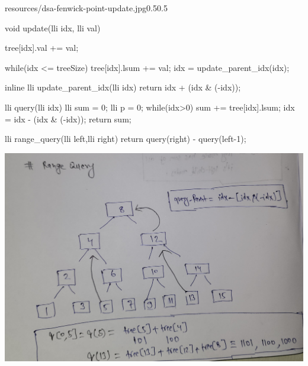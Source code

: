 \begin{lfigure}{resources/dsa-fenwick-point-update.jpg}{0.5}{0.5}

    \begin{code3}
    void update(lli idx, lli val)
    {
        tree[idx].val += val;

        while(idx <= treeSize)
        {
            tree[idx].lsum += val;
            idx = update_parent_idx(idx);
        }
    }

  
    inline lli update_parent_idx(lli idx)
    {
        return  idx + (idx & (-idx));
    }
    \end{code3}

\end{lfigure}

\begin{fullwidth}
\begin{minipage}[c]{0.5\fullwidthlen}
    \begin{code3}
    lli query(lli idx)
    {
        lli sum = 0;
        lli p = 0;
        while(idx>0)
        {
            sum += tree[idx].lsum;
            idx = idx - (idx & (-idx));        
        } 
        return sum;
    }
    
    lli range_query(lli left,lli right)
    {
        return query(right) - query(left-1);
    }
    \end{code3}
\end{minipage}\hspace{10pt}
\begin{minipage}[c]{0.47\fullwidthlen}
    \includegraphics[width=\textwidth]{resources/dsa-fenwick-range-query.jpg}
\end{minipage}
\end{fullwidth}
